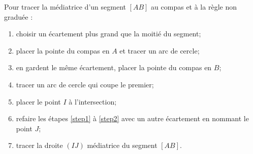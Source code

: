\begin{mymeth}
	Pour tracer la médiatrice d'un segment $[AB]$ au compas et à la règle non graduée :
	
	\begin{enumerate}
		\item choisir un écartement plus grand que la moitié du segment;
		\item placer la pointe du compas en $A$ et tracer un arc de cercle;\label{step1}
		\item en gardent le même écartement, placer la pointe du compas en $B$;
		\item tracer un arc de cercle qui coupe le premier;
		\item placer le point $I$ à l'intersection;\label{step2}
		\item refaire les étapes \ref{step1} à \ref{step2} avec un autre écartement en nommant le point $J$;
		\item tracer la droite $(IJ)$ médiatrice du segment $[AB]$.
		
	\end{enumerate}
\end{mymeth}